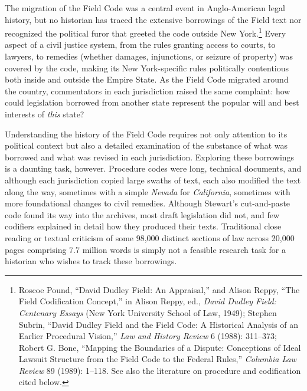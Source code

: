 \documentclass[12pt,]{article}
\let\rmarkdownfootnote\footnote%
\def\footnote{\protect\rmarkdownfootnote}
\begin{document}
The migration of the Field Code was a central event in Anglo-American
legal history, but no historian has traced the extensive borrowings of
the Field text nor recognized the political furor that greeted the code
outside New York.\footnote{Roscoe Pound, ``David Dudley Field: An
  Appraisal,'' and Alison Reppy, ``The Field Codification Concept,'' in
  Alison Reppy, ed., \emph{David Dudley Field: Centenary Essays} (New
  York University School of Law, 1949); Stephen Subrin, ``David Dudley
  Field and the Field Code: A Historical Analysis of an Earlier
  Procedural Vision,'' \emph{Law and History Review} 6 (1988): 311--373;
  Robert G. Bone, ``Mapping the Boundaries of a Dispute: Conceptions of
  Ideal Lawsuit Structure from the Field Code to the Federal Rules,''
  \emph{Columbia Law Review} 89 (1989): 1--118. See also the literature
  on procedure and codification cited below.} Every aspect of a civil
justice system, from the rules granting access to courts, to lawyers, to
remedies (whether damages, injunctions, or seizure of property) was
covered by the code, making its New York-specific rules politically
contentious both inside and outside the Empire State. As the Field Code
migrated around the country, commentators in each jurisdiction raised
the same complaint: how could legislation borrowed from another state
represent the popular will and best interests of \emph{this} state?

Understanding the history of the Field Code requires not only attention
to its political context but also a detailed examination of the
substance of what was borrowed and what was revised in each
jurisdiction. Exploring these borrowings is a daunting task, however.
Procedure codes were long, technical documents, and although each
jurisdiction copied large swaths of text, each also modified the text
along the way, sometimes with a simple \emph{Nevada} for
\emph{California}, sometimes with more foundational changes to civil
remedies. Although Stewart's cut-and-paste code found its way into the
archives, most draft legislation did not, and few codifiers explained in
detail how they produced their texts. Traditional close reading or
textual criticism of some 98,000 distinct sections of law across 20,000
pages comprising 7.7 million words is simply not a feasible research
task for a historian who wishes to track these borrowings.
\end{document}
